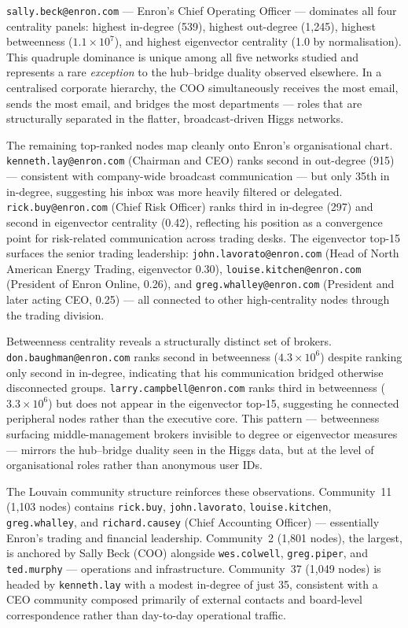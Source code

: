 \texttt{sally.beck@enron.com} — Enron's Chief Operating Officer — dominates
all four centrality panels: highest in-degree (539), highest out-degree
(1{,}245), highest betweenness ($1.1 \times 10^{7}$), and highest eigenvector
centrality (1.0 by normalisation).
This quadruple dominance is unique among all five networks studied and
represents a rare \textit{exception} to the hub--bridge duality observed
elsewhere.
In a centralised corporate hierarchy, the COO simultaneously receives the
most email, sends the most email, and bridges the most departments — roles
that are structurally separated in the flatter, broadcast-driven Higgs
networks.

The remaining top-ranked nodes map cleanly onto Enron's organisational
chart.
\texttt{kenneth.lay@enron.com} (Chairman and CEO) ranks second in
out-degree (915) — consistent with company-wide broadcast communication —
but only 35th in in-degree, suggesting his inbox was more heavily filtered
or delegated.
\texttt{rick.buy@enron.com} (Chief Risk Officer) ranks third in
in-degree (297) and second in eigenvector centrality (0.42), reflecting his
position as a convergence point for risk-related communication across
trading desks.
The eigenvector top-15 surfaces the senior trading leadership:
\texttt{john.lavorato@enron.com} (Head of North American Energy Trading,
eigenvector 0.30), \texttt{louise.kitchen@enron.com} (President of Enron
Online, 0.26), and \texttt{greg.whalley@enron.com} (President and later
acting CEO, 0.25) — all connected to other high-centrality nodes through
the trading division.

Betweenness centrality reveals a structurally distinct set of brokers.
\texttt{don.baughman@enron.com} ranks second in betweenness ($4.3 \times
10^{6}$) despite ranking only second in in-degree, indicating that his
communication bridged otherwise disconnected groups.
\texttt{larry.campbell@enron.com} ranks third in betweenness ($3.3 \times
10^{6}$) but does not appear in the eigenvector top-15, suggesting he
connected peripheral nodes rather than the executive core.
This pattern — betweenness surfacing middle-management brokers invisible
to degree or eigenvector measures — mirrors the hub--bridge duality seen
in the Higgs data, but at the level of organisational roles rather than
anonymous user IDs.

The Louvain community structure reinforces these observations.
Community~11 (1{,}103 nodes) contains \texttt{rick.buy}, \texttt{john.lavorato},
\texttt{louise.kitchen}, \texttt{greg.whalley}, and \texttt{richard.causey}
(Chief Accounting Officer) — essentially Enron's trading and financial
leadership.
Community~2 (1{,}801 nodes), the largest, is anchored by Sally Beck (COO)
alongside \texttt{wes.colwell}, \texttt{greg.piper}, and
\texttt{ted.murphy} — operations and infrastructure.
Community~37 (1{,}049 nodes) is headed by \texttt{kenneth.lay} with
a modest in-degree of just 35, consistent with a CEO community composed
primarily of external contacts and board-level correspondence rather than
day-to-day operational traffic.

